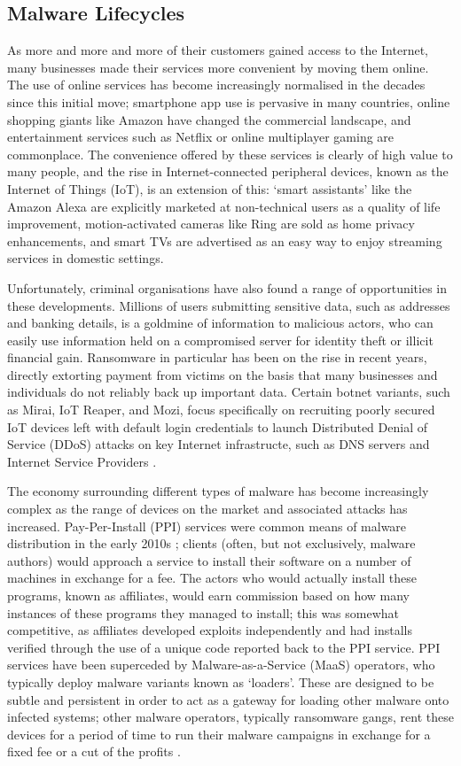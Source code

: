 \documentclass[10pt,sigconf]{acmart}
\begin{document}
\subsection{Malware Lifecycles}

As more and more and more of their customers gained access to the Internet, many businesses made their services more convenient by moving them online.
The use of online services has become increasingly normalised in the decades since this initial move;
smartphone app use is pervasive in many countries, online shopping giants like Amazon have changed the commercial landscape, and entertainment services such as Netflix or online multiplayer gaming are commonplace.
The convenience offered by these services is clearly of high value to many people, and the rise in Internet-connected peripheral devices, known as the Internet of Things (IoT), is an extension of this:
`smart assistants' like the Amazon Alexa are explicitly marketed at non-technical users as a quality of life improvement, motion-activated cameras like Ring are sold as home privacy enhancements, and smart TVs are advertised as an easy way to enjoy streaming services in domestic settings.

Unfortunately, criminal organisations have also found a range of opportunities in these developments.
Millions of users submitting sensitive data, such as addresses and banking details, is a goldmine of information to malicious actors, who can easily use information held on a compromised server for identity theft or illicit financial gain.
Ransomware in particular has been on the rise in recent years, directly extorting payment from victims on the basis that many businesses and individuals do not reliably back up important data.
Certain botnet variants, such as Mirai, IoT Reaper, and Mozi, focus specifically on recruiting poorly secured IoT devices left with default login credentials to launch Distributed Denial of Service (DDoS) attacks on key Internet infrastructe, such as DNS servers and Internet Service Providers \cite{antonakakris2017}.

The economy surrounding different types of malware has become increasingly complex as the range of devices on the market and associated attacks has increased.
Pay-Per-Install (PPI) services were common means of malware distribution in the early 2010s \cite{ppi};
clients (often, but not exclusively, malware authors) would approach a service to install their software on a number of machines in exchange for a fee.
The actors who would actually install these programs, known as affiliates, would earn commission based on how many instances of these programs they managed to install;
this was somewhat competitive, as affiliates developed exploits independently and had installs verified through the use of a unique code reported back to the PPI service.
PPI services have been superceded by Malware-as-a-Service (MaaS) operators, who typically deploy malware variants known as `loaders'.
These are designed to be subtle and persistent in order to act as a gateway for loading other malware onto infected systems;
other malware operators, typically ransomware gangs, rent these devices for a period of time to run their malware campaigns in exchange for a fixed fee or a cut of the profits \cite{emotet-lease}.
\end{document}
